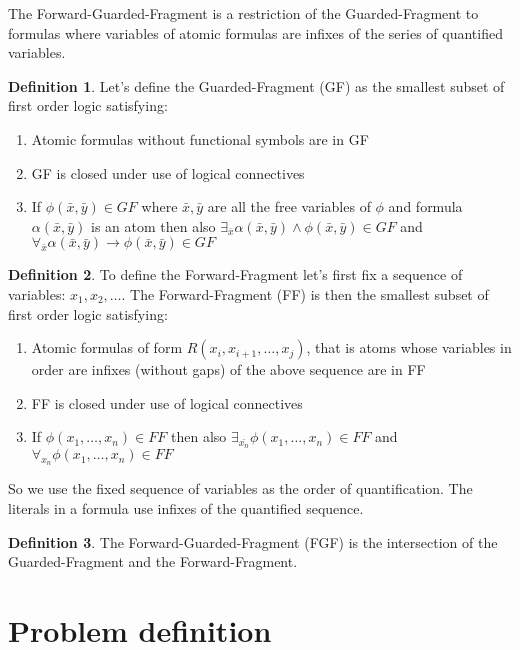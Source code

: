\documentclass[english, shortabstract]{iithesis}
\theoremstyle{definition} \newtheorem{definition}{Definition}[chapter]
\theoremstyle{remark} \newtheorem{remark}[definition]{Observation}
\theoremstyle{plain} \newtheorem{theorem}[definition]{Theorem}
\theoremstyle{plain} \newtheorem{lemma}[definition]{Lemma}
\begin{document}
The Forward-Guarded-Fragment is a restriction of the Guarded-Fragment to formulas where variables of atomic formulas are infixes of the series of quantified variables. 
\begin{definition}
Let's define the Guarded-Fragment (GF) as the smallest subset of first order logic satisfying:
\begin{enumerate}
    \item Atomic formulas without functional symbols are in GF
    \item GF is closed under use of logical connectives
    \item If $\phi(\bar{x}, \bar{y}) \in GF$ where $\bar{x}, \bar{y}$ are all the free variables of $\phi$ and formula $\alpha(\bar{x},\bar{y})$ is an atom
then also $\exists_{\bar{x}} \alpha(\bar{x}, \bar{y}) \land \phi(\bar{x}, \bar{y}) \in GF$ and $\forall_{\bar{x}} \alpha(\bar{x}, \bar{y}) \rightarrow \phi(\bar{x}, \bar{y}) \in GF$
\end{enumerate}
\end{definition}
\begin{definition}
To define the Forward-Fragment let's first fix a sequence of variables: $x_1, x_2, \dots$. The Forward-Fragment (FF) is then the smallest subset of first order logic satisfying:
\begin{enumerate}
    \item Atomic formulas of form $R(x_i, x_{i+1},\dots,x_{j})$, that is atoms whose variables in order are infixes (without gaps) of the above sequence are in FF
    \item FF is closed under use of logical connectives
    \item If $\phi(x_1,\dots, x_{n}) \in FF$ then also $\exists_{\bar{x_{n}}} \phi(x_1,\dots, x_{n}) \in FF$ and $\forall_{x_n} \phi(x_1,\dots, x_{n}) \in FF$
\end{enumerate}
\end{definition}
So we use the fixed sequence of variables as the order of quantification. The literals in a formula use infixes of the quantified sequence.
\begin{definition}
The Forward-Guarded-Fragment (FGF) is the intersection of the Guarded-Fragment and the Forward-Fragment.
\end{definition}

\section{Problem definition}
\end{document}
